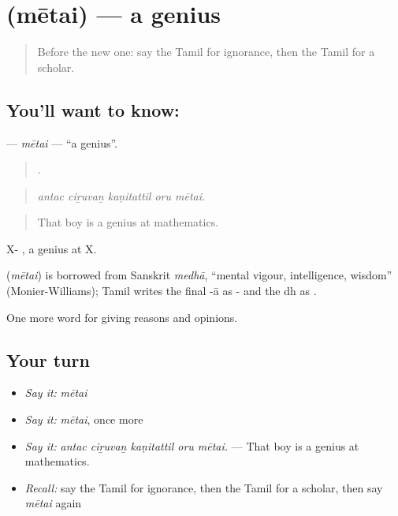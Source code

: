 \section[\texorpdfstring{\ta{மேதை} (mētai)}{மேதை (mētai)}]{ (mētai) — a genius}

\label{lesson:TA-C367-metai}



\begin{quote}
Before the new one: say the Tamil for ignorance, then the Tamil for a scholar.
\end{quote}

\subsection*{You'll want to know: }
\textbf{} — \emph{mētai} — \textquotedblleft{}a genius\textquotedblright{}.

\begin{quote}
    .
\end{quote}

\begin{quote}
\emph{antac ciṟuvaṉ kaṇitattil oru mētai.}
\end{quote}

\begin{quote}
That boy is a genius at mathematics.
\end{quote}

X- , a genius at X.

\begin{cousinweb}
\textbf{} (\emph{mētai}) is borrowed from Sanskrit \emph{medhā}, \textquotedblleft{}mental vigour, intelligence, wisdom\textquotedblright{} (Monier-Williams); Tamil writes the final -ā as - and the dh as .
\end{cousinweb}

\begin{grammarlens}[title={What you've built}]
One more word for giving reasons and opinions.
\end{grammarlens}

\subsection*{Your turn}
\begin{itemize}
\raggedright
  \item \emph{Say it:} \emph{mētai}
  \item \emph{Say it:} \emph{mētai}, once more
  \item \emph{Say it:} \emph{antac ciṟuvaṉ kaṇitattil oru mētai.} — That boy is a genius at mathematics.
  \item \emph{Recall:} say the Tamil for ignorance, then the Tamil for a scholar, then say \emph{mētai} again
\end{itemize}

